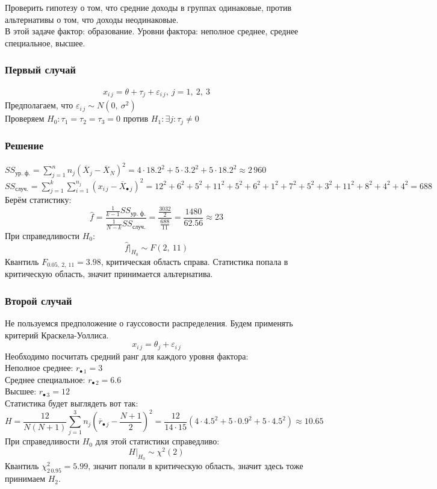 \documentclass[12pt, a4paper]{article}
\begin{document}
Проверить гипотезу о том, что средние доходы в группах одинаковые, против альтернативы о том, что доходы неодинаковые.\\
В этой задаче фактор: образование. Уровни фактора: неполное среднее, среднее специальное, высшее.\\
\subsubsection*{Первый случай}
\begin{equation*}
    \begin{aligned}
        x_{i\, j} = \theta + \tau_j + \varepsilon_{i\, j},\ j = 1,\ 2,\ 3
    \end{aligned}
\end{equation*}
Предполагаем, что $\varepsilon_{i\, j} \sim N(0,\ \sigma^2)$\\
Проверяем $H_0: \tau_1 = \tau_2 = \tau_3 = 0$ против $H_1: \exists j: \tau_j \neq 0$
\subsubsection*{Решение}
$SS_{\text{ур. ф.}} = \sum_{j = 1}^{n} n_j{\left( \overline{X}_j - \overline{X}_N \right)}^2 = 4\cdot 18.2^2 + 5\cdot 3.2^2 + 5\cdot 18.2^2 \approx 2\,960$\\
$SS_{\text{случ.}} = \sum_{j = 1}^{k} \sum_{i = 1}^{n_j} {\left( x_{i\, j} - \overline{X}_{\bullet\, j} \right)}^2 = 12^2 + 6^2 + 5^2 + 11^2 + 5^2 + 6^2 + 1^2 + 7^2 + 5^2 + 3^2 + 11^2 + 8^2 + 4^2 + 4^2 = 688$\\
Берём статистику:
\[\hat f = \frac{\frac{1}{k - 1} SS_{\text{ур. ф.}}}{ \frac{1}{N - k} SS_{\text{случ.}}} = \frac{\frac{3032}{2}}{\frac{688}{11}} = \frac{1480}{62.56}\approx 23\]
При справедливости $H_0$:
\[\hat f \Big|_{H_0} \sim F(2,\ 11)\]
Квантиль $F_{0.05,\ 2,\ 11} = 3.98$, критическая область справа. Статистика попала в критическую область, значит принимается альтернатива.
\subsubsection*{Второй случай}
Не пользуемся предположение о гауссовости распределения. Будем применять критерий Краскела-Уоллиса.
\[x_{i\, j} = \theta_j + \varepsilon_{i\, j}\]
Необходимо посчитать средний ранг для каждого уровня фактора:\\
Неполное среднее: $r_{\bullet\, 1} = 3$\\
Среднее специальное: $r_{\bullet\, 2} = 6.6$\\
Высшее: $r_{\bullet\, 3} = 12$\\
Статистика будет выглядеть вот так:
\[H = \frac{12}{N(N + 1)} \sum_{j = 1}^{3} n_j {\left( \overline{r}_{\bullet\, j} - \frac{N + 1}{2} \right)}^2 = \frac{12}{14\cdot 15}\left( 4\cdot 4.5^2 + 5\cdot 0.9^2 + 5\cdot 4.5^2 \right) \approx 10.65\]
При справедливости $H_0$ для этой статистики справедливо:
\[H\Big|_{H_0} \sim \chi^2(2)\]
Квантиль $\chi^2_{2\, 0.95} = 5.99$, значит попали в критическую область, значит здесь тоже принимаем $H_2$.
\end{document}
